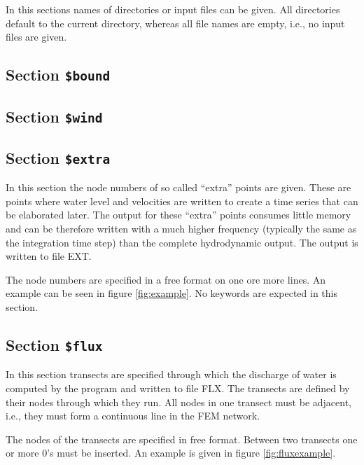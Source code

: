 \documentclass{report}
\begin{document}
In this sections names of directories or input files can be
given. All directories default to the current directory,
whereas all file names are empty, i.e., no input files are
given.




\subsection{Section {\tt \$bound}}




\subsection{Section {\tt \$wind}}





\subsection{Section {\tt \$extra}}

In this section the node numbers of so called ``extra'' points are given. 
These are points where water level and velocities are written to create
a time series that can be elaborated later. The output for these ``extra''
points consumes little memory and can be therefore written with a
much higher frequency (typically the same as the integration time step)
than the complete hydrodynamic output. The output is written
to file EXT.

The node numbers are specified in a free format on one ore more lines.
An example can be seen in figure \ref{fig:example}. No keywords
are expected in this section.


\subsection{Section {\tt \$flux}}

In this section transects are specified through which the discharge
of water is computed by the program and written to file FLX.
The transects are defined by their nodes through which they run.
All nodes in one transect must be adjacent, i.e., they must form a
continuous line in the FEM network.

The nodes of the transects are specified in free format. Between
two transects one or more 0's must be inserted. An example is given in
figure \ref{fig:fluxexample}.
\end{document}
